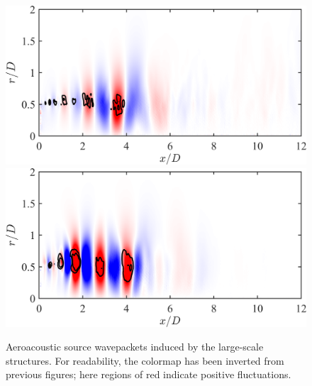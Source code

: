 \begin{figure}
	\centering
		\includegraphics[width=0.65\linewidth]{Figures/ch5_St005_SL_131.png}\\
		\includegraphics[width=0.65\linewidth]{Figures/ch5_St025_SL_1.png}
	\caption{Aeroacoustic source wavepackets induced by the large-scale structures. For readability, the colormap has been inverted from previous figures; here regions of red indicate positive fluctuations.}
	\label{fig:SL}
\end{figure}

